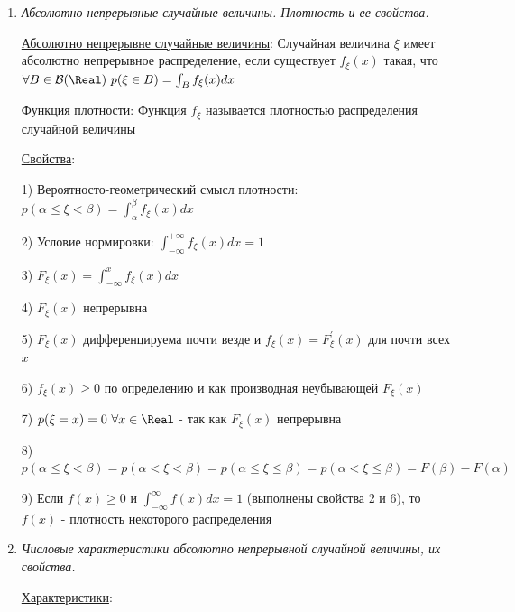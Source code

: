\documentclass[12pt]{article}
\begin{document}
\begin{enumerate}
    7) Если функция распределения непрерывна в точке $x = x_0$, то очевидно, что вероятность попадания в эту точка $p(\xi = x_0) = 0$ (следствие из 6 пункта)
    
    8) Если $F(x)$ непрерывна $\forall x \in \Real$, то $p(\alpha \leq \xi < \beta) = p(\alpha < \xi < \beta) = p(\alpha \leq \xi \leq \beta) = p(\alpha < \xi \leq \beta) = F(\beta) - F(\alpha)$
    
    \item \textit{Абсолютно непрерывные случайные величины. Плотность и ее свойства.}

    \hyperlink{continuousdistributionproperties}{Абсолютно непрерывне случайные величины}: Случайная величина $\xi$ имеет абсолютно непрерывное распределение, если существует $f_\xi(x)$ такая, что $\forall B \in \mathcal{B}(\Real)
    \ p(\xi \in B) = \int_B f_\xi(x)dx$

    \hyperlink{densityfunctiondefinition}{Функция плотности}: Функция $f_\xi$ называется плотностью распределения случайной величины

    \hyperlink{densityfunctionproperties}{Свойства}:

    1) Вероятносто-геометрический смысл плотности: $p(\alpha \leq \xi < \beta) = \int_{\alpha}^\beta f_\xi(x) dx$

    2) Условие нормировки: $\int_{-\infty}^{+\infty} f_\xi(x)dx = 1$

    3) $F_\xi(x) = \int_{-\infty}^x f_\xi(x)dx$

    4) $F_\xi(x)$ непрерывна 

    5) $F_\xi(x)$ дифференцируема почти везде и $f_\xi(x) = F^\prime_\xi(x)$ для почти всех $x$

    6) $f_\xi(x) \geq 0$ по определению и как производная неубывающей $F_\xi(x)$

    7) $p(\xi = x) = 0 \ \forall x \in \Real$ - так как $F_\xi(x)$ непрерывна

    8) $p(\alpha \leq \xi < \beta) = p(\alpha < \xi < \beta) = p(\alpha \leq \xi \leq \beta) = p(\alpha < \xi \leq \beta) = F(\beta) - F(\alpha)$

    9) \Ths Если $f(x) \geq 0$ и $\int_{-\infty}^{\infty} f(x)dx = 1$ (выполнены свойства 2 и 6), то $f(x)$ - плотность некоторого распределения

    \item \textit{Числовые характеристики абсолютно непрерывной случайной величины, их свойства.}

    \hyperlink{attributesofcontinuousrandomvariable}{Характеристики}:


\end{enumerate}
\end{document}
